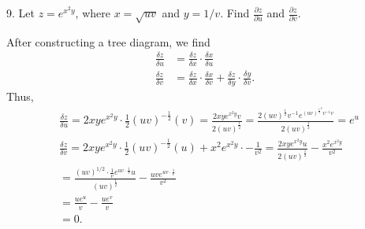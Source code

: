 \documentclass{report}
\begin{document}
    \bigbreak \noindent 
    \begin{mdframed}
        9. Let $z=e^{x^2 y}$, where $x=\sqrt{u v}$ and $y=1 / v$. Find $\frac{\partial z}{\partial u}$ and $\frac{\partial z}{\partial v}$.
    \end{mdframed}
    \bigbreak \noindent 
    After constructing a tree diagram, we find
    \begin{align*}
        \frac{\delta z}{\delta u} &= \frac{\delta z}{\delta x} \cdot \frac{\delta x}{\delta u}  \\
        \frac{\delta z}{\delta v} &= \frac{\delta z}{\delta x} \cdot \frac{\delta x}{\delta v} + \frac{\delta z}{\delta y}\cdot \frac{\delta y}{\delta v}
    .\end{align*}
    Thus,
    \begin{align*}
        &\frac{\delta z}{\delta u} = 2xye^{x^{2}y} \cdot \frac{1}{2}(uv)^{-\frac{1}{2}}(v) = \frac{2xye^{x^{2}y}v}{2(uv)^{\frac{1}{2}}} = \frac{2(uv)^{\frac{1}{2}}v^{-1}e^{(uv)^{\frac{1}{2}}^{2}v^{-1}v}}{2(uv)^{\frac{1}{2}}} = e^{u} \\
        &\frac{\delta z}{\delta v} = 2xye^{x^{2}y} \cdot \frac{1}{2}(uv)^{-\frac{1}{2}}(u) + x^{2}e^{x^{2}y}\cdot -\frac{1}{v^{2}} = \frac{2xye^{x^{2}y}u}{2(uv)^{\frac{1}{2}}} - \frac{x^{2}e^{x^{2}y}}{v^{2}} \\
        &=\frac{(uv)^{1/2}\cdot \frac{1}{v}e^{uv\cdot \frac{1}{v}}u}{(uv)^{\frac{1}{2}}} - \frac{uve^{uv\cdot \frac{1}{v}}}{v^{2}} \\
        &=\frac{ue^{u}}{v}-\frac{ue^{v}}{v} \\
        &=0
    .\end{align*}



 
\end{document}
